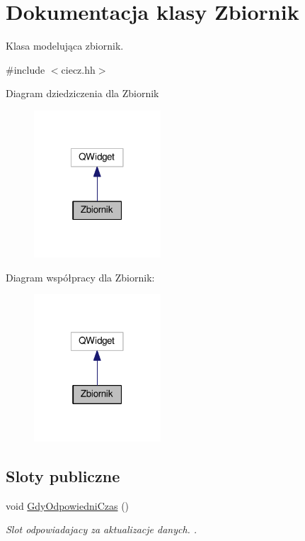 \hypertarget{class_zbiornik}{\section{Dokumentacja klasy Zbiornik}
\label{class_zbiornik}
}


Klasa modelująca zbiornik.  




{\ttfamily \#include $<$ciecz.\-hh$>$}



Diagram dziedziczenia dla Zbiornik\nopagebreak
\begin{figure}[H]
\begin{center}
\leavevmode
\includegraphics[width=134pt]{class_zbiornik__inherit__graph}
\end{center}
\end{figure}


Diagram współpracy dla Zbiornik\-:\nopagebreak
\begin{figure}[H]
\begin{center}
\leavevmode
\includegraphics[width=134pt]{class_zbiornik__coll__graph}
\end{center}
\end{figure}
\subsection*{Sloty publiczne}
\begin{DoxyCompactItemize}
\item 
void \hyperlink{class_zbiornik_aa07ceb0fcbf307f0aa1eb75c32f3f47e}{Gdy\-Odpowiedni\-Czas} ()
\begin{DoxyCompactList}\small\item\em Slot odpowiadajacy za aktualizacje danych. . \end{DoxyCompactList}\end{DoxyCompactItemize}
